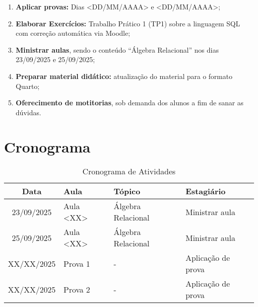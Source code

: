 \documentclass[12pt, a4paper]{article}
\begin{document}


\begin{enumerate}
    \item \textbf{Aplicar provas:} Dias <DD/MM/AAAA> e <DD/MM/AAAA>;
    \item \textbf{Elaborar Exercícios:} Trabalho Prático 1 (TP1) sobre a linguagem SQL com correção automática via Moodle;
    \item \textbf{Ministrar aulas}, sendo o conteúdo ``Álgebra Relacional'' nos dias 23/09/2025 e 25/09/2025;
    \item \textbf{Preparar material didático:} atualização do material para o formato Quarto;
    \item \textbf{Oferecimento de motitorias}, sob demanda dos alunos a fim de sanar as dúvidas.
\end{enumerate}

\section{Cronograma} \label{sec:cronograma}



\begin{table}[htbp] \centering \caption{Cronograma de Atividades} \label{tab:atividades}
    \begin{tabular}{|c|l|l|l|} \hline
        \textbf{Data} & \textbf{Aula} & \textbf{Tópico} & \textbf{Estagiário} \\ \hline
        
        23/09/2025 & Aula <XX> & Álgebra Relacional & Ministrar aula \\ \hline
        25/09/2025 & Aula <XX> & Álgebra Relacional & Ministrar aula \\ \hline
        XX/XX/2025 & Prova 1 & - & Aplicação de prova \\ \hline
        XX/XX/2025 & Prova 2 & - & Aplicação de prova \\ \hline
    \end{tabular}
\end{table}
\end{document}
